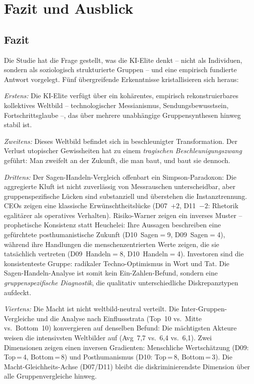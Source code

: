 \documentclass[12pt,a4paper]{article}
\begin{document}
\section{Fazit und Ausblick}
\label{sec:fazit}

\subsection{Fazit}

Die Studie hat die Frage gestellt, was die KI-Elite denkt -- nicht als Individuen, sondern als soziologisch strukturierte Gruppen -- und eine empirisch fundierte Antwort vorgelegt. Fünf übergreifende Erkenntnisse kristallisieren sich heraus:

\emph{Erstens:} Die KI-Elite verfügt über ein kohärentes, empirisch rekonstruierbares kollektives Weltbild -- technologischer Messianismus, Sendungsbewusstsein, Fortschrittsglaube --, das über mehrere unabhängige Gruppensynthesen hinweg stabil ist.

\emph{Zweitens:} Dieses Weltbild befindet sich in beschleunigter Transformation. Der Verlust utopischer Gewissheiten hat zu einem \emph{tragischen Beschleunigungszwang} geführt: Man zweifelt an der Zukunft, die man baut, und baut sie dennoch.

\emph{Drittens:} Der Sagen-Handeln-Vergleich offenbart ein Simpson-Paradoxon: Die aggregierte Kluft ist nicht zuverlässig von Messrauschen unterscheidbar, aber gruppenspezifische Lücken sind substanziell und überstehen die Instanztrennung. CEOs zeigen eine klassische Erwünschtheitslücke (D07~$+2$, D11~$-2$: Rhetorik egalitärer als operatives Verhalten). Risiko-Warner zeigen ein inverses Muster -- prophetische Konsistenz statt Heuchelei: Ihre Aussagen beschreiben eine gefürchtete posthumanistische Zukunft (D10~Sagen$=$9, D09~Sagen$=$4), während ihre Handlungen die menschenzentrierten Werte zeigen, die sie tatsächlich vertreten (D09~Handeln$=$8, D10~Handeln$=$4). Investoren sind die konsistenteste Gruppe: radikaler Techno-Optimismus in Wort und Tat. Die Sagen-Handeln-Analyse ist somit kein Ein-Zahlen-Befund, sondern eine \emph{gruppenspezifische Diagnostik}, die qualitativ unterschiedliche Diskrepanztypen aufdeckt.

\emph{Viertens:} Die Macht ist nicht weltbild-neutral verteilt. Die Inter-Gruppen-Vergleiche und die Analyse nach Einflussstrata (Top~10 vs.\ Mitte vs.\ Bottom~10) konvergieren auf denselben Befund: Die mächtigsten Akteure weisen die intensivsten Weltbilder auf (Avg~7,7 vs.\ 6,4 vs.\ 6,1). Zwei Dimensionen zeigen einen inversen Gradienten: Menschliche Wertschätzung (D09: Top\,=\,4, Bottom\,=\,8) und Posthumanismus (D10: Top\,=\,8, Bottom\,=\,3). Die Macht-Gleichheits-Achse (D07/D11) bleibt die diskriminierendste Dimension über alle Gruppenvergleiche hinweg.
\end{document}

